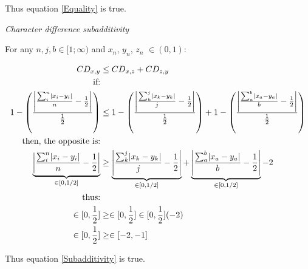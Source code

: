 \documentclass[12pt,letterpaper]{article}
\DeclarePairedDelimiter\abs{\lvert}{\rvert}%
\renewcommand{\subsection}[1]{%
\bigskip
\begin{center}
\begin{large}
\normalfont\itshape #1
\end{large}
\end{center}}
\begin{document}
Thus equation \ref{Equality} is true.

\subsection{Character difference subadditivity}

For any $n, j, b \in [1;\infty)$ and $x_{n}$, $y_{n}$, $z_{n}$ $\in (0,1)$:

\begin{equation}
    \label{subadditivity_demo}
    \begin{aligned}
    CD_{x,y} &\leq CD_{x,z} + CD_{z,y}\\
    \text{if:}\\
    1 - \left(\frac{\abs*{\frac{\sum_{i}^{n}\abs{x_{i}-y_{i}}}{n}-\frac{1}{2}}}{\frac{1}{2}}\right)
     &\leq 
     1 - \left(\frac{\abs*{\frac{\sum_{k}^{j}\abs{x_{k}-y_{k}}}{j}-\frac{1}{2}}}{\frac{1}{2}}\right) 
     +
     1 - \left(\frac{\abs*{\frac{\sum_{a}^{b}\abs{x_{a}-y_{a}}}{b}-\frac{1}{2}}}{\frac{1}{2}}\right) \\
     \text{then, the opposite is:}\\
    \underbrace{\abs*{\frac{\sum_{i}^{n}\abs{x_{i}-y_{i}}}{n}-\frac{1}{2}} }_{\in[0,1/2]}
     &\geq 
     \underbrace{\abs*{\frac{\sum_{k}^{j}\abs{x_{k}-y_{k}}}{j}-\frac{1}{2}} }_{\in[0,1/2]}
     +
     \underbrace{\abs*{\frac{\sum_{a}^{b}\abs{x_{a}-y_{a}}}{b}-\frac{1}{2}} }_{\in[0,1/2]} - 2\\
     \text{thus:}\\
     \in[0,\frac{1}{2}] &\geq \in[0,\frac{1}{2}] \in[0,\frac{1}{2}] (-2) \\
     \in[0,\frac{1}{2}] &\geq \in[-2,-1]\\
    \end{aligned}
\end{equation}

Thus equation \ref{Subadditivity} is true.



\end{document}
